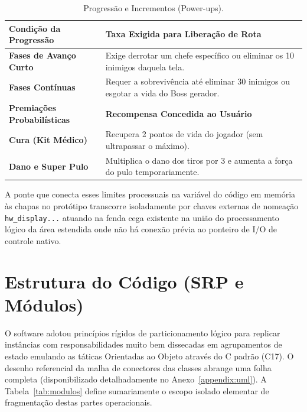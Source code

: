 \documentclass[10pt,twocolumn,letterpaper]{article}
\begin{document}
\begin{table}[H]
\centering
\caption{Progressão e Incrementos (Power-ups).}
\label{tab:pontuacao}
\scriptsize
\begin{tabularx}{\columnwidth}{@{}lX@{}}
\toprule
\textbf{Condição da Progressão} & \textbf{Taxa Exigida para Liberação de Rota} \\ \midrule
\textbf{Fases de Avanço Curto} & Exige derrotar um chefe específico ou eliminar os 10 inimigos daquela tela. \\
\textbf{Fases Contínuas} & Requer a sobrevivência até eliminar 30 inimigos ou esgotar a vida do Boss gerador. \\ \midrule
\textbf{Premiações Probabilísticas} & \textbf{Recompensa Concedida ao Usuário} \\ \midrule
\textbf{Cura (Kit Médico)} & Recupera 2 pontos de vida do jogador (sem ultrapassar o máximo). \\
\textbf{Dano e Super Pulo} & Multiplica o dano dos tiros por 3 e aumenta a força do pulo temporariamente. \\ \bottomrule
\end{tabularx}
\end{table}

A ponte que conecta esses limites processuais na variável do código em memória às chapas no protótipo transcorre isoladamente por chaves externas de nomeação \texttt{hw\_display...} atuando na fenda cega existente na união do processamento lógico da área estendida onde não há conexão prévia ao ponteiro de I/O de controle nativo.

\section{Estrutura do Código (SRP e Módulos)}
O software adotou princípios rígidos de particionamento lógico para replicar instâncias com responsabilidades muito bem dissecadas em agrupamentos de estado emulando as táticas Orientadas ao Objeto através do C padrão (C17). O desenho referencial da malha de conectores das classes abrange uma folha completa (disponibilizado detalhadamente no Anexo~\ref{appendix:uml}). A Tabela~\ref{tab:modulos} define sumariamente o escopo isolado elementar de fragmentação destas partes operacionais.
\end{document}
